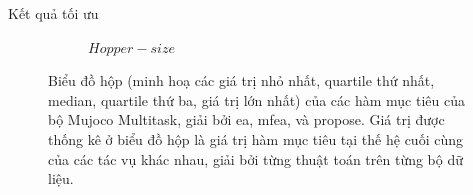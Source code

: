 \begin{frame}{Kết quả tối ưu}
\begin{figure}[hp]
\begin{subfigure}[b]{0.49\linewidth}
                \caption{$Hopper-size$}
                \label{fig:result:mujoco:weierstrass}
            \end{subfigure}
            \hfill
            \caption{Biểu đồ hộp (minh hoạ các giá trị nhỏ nhất, quartile thứ nhất, median, quartile thứ ba, giá trị lớn nhất) của các hàm mục tiêu của bộ Mujoco Multitask, giải bởi \gls{ea}, \gls{mfea}, và \gls{propose}.
                     Giá trị được thống kê ở biểu đồ hộp là giá trị hàm mục tiêu tại thế hệ cuối cùng của các tác vụ khác nhau, giải bởi từng thuật toán trên từng bộ dữ liệu.}
            \label{fig:result:mujoco}
        \end{figure}
    \end{frame}
    
